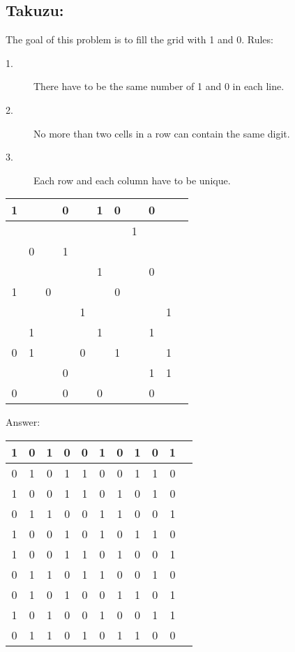 \documentclass{article}
\begin{document}
\subsection*{Takuzu:}
The goal of this problem is to fill the grid with 1 and 0. 
Rules:
\begin{description}
\item[1.] There have to be the same number of 1 and 0 in each line.
\item[2.] No more than two cells in a row can contain the same digit.
\item[3.] Each row and each column have to be unique.
\end{description}

\begin{table}[ht]
\centering
\begin{tabular}{|c|c|c|c|c|c|c|c|c|c|c|}
\hline 1 &   &   & 0 &   & 1 & 0 &   & 0 &   \\ 
\hline   &   &   &   &   &   &   & 1 &   &   \\ 
\hline   & 0 &   & 1 &   &   &   &   &   &   \\ 
\hline   &   &   &   &   & 1 &   &   & 0 &   \\ 
\hline 1 &   & 0 &   &   &   & 0 &   &   &   \\ 
\hline   &   &   &   & 1 &   &   &   &   & 1 \\ 
\hline   & 1 &   &   &   & 1 &   &   & 1 &   \\ 
\hline 0 & 1 &   &   & 0 &   & 1 &   &   & 1 \\ 
\hline   &   &   & 0 &   &   &   &   & 1 & 1 \\ 
\hline 0 &   &   & 0 &   & 0 &   &   & 0 &   \\
\hline
\end{tabular}
\end{table} 

Answer:
\begin{table}[ht]
\centering
\begin{tabular}{|c|c|c|c|c|c|c|c|c|c|c|}
\hline 1 & 0 & 1 & 0 & 0 & 1 & 0 & 1 & 0 & 1 \\ 
\hline 0 & 1 & 0 & 1 & 1 & 0 & 0 & 1 & 1 & 0 \\ 
\hline 1 & 0 & 0 & 1 & 1 & 0 & 1 & 0 & 1 & 0 \\ 
\hline 0 & 1 & 1 & 0 & 0 & 1 & 1 & 0 & 0 & 1 \\ 
\hline 1 & 0 & 0 & 1 & 0 & 1 & 0 & 1 & 1 & 0 \\ 
\hline 1 & 0 & 0 & 1 & 1 & 0 & 1 & 0 & 0 & 1 \\ 
\hline 0 & 1 & 1 & 0 & 1 & 1 & 0 & 0 & 1 & 0 \\ 
\hline 0 & 1 & 0 & 1 & 0 & 0 & 1 & 1 & 0 & 1 \\ 
\hline 1 & 0 & 1 & 0 & 0 & 1 & 0 & 0 & 1 & 1 \\ 
\hline 0 & 1 & 1 & 0 & 1 & 0 & 1 & 1 & 0 & 0 \\
\hline
\end{tabular}
\end{table} 
\end{document}

